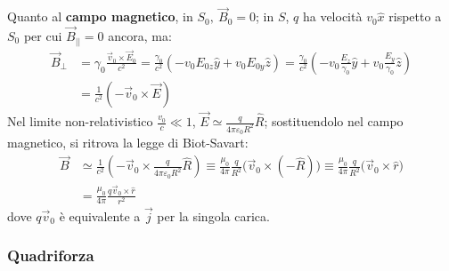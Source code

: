 \documentclass[10pt, a4paper]{scrartcl}
\numberwithin{equation}{subsection}
\theoremstyle{style1}
\begin{document}
Quanto al \textbf{campo magnetico}, in $S_0, \ \vec{B}_0 = 0$; in $S$, $q$ ha velocit\`a $v_0 \hat{x}$ rispetto a $S_0$ per cui $\vec{B}_{| | } =0 $ ancora, ma:
\begin{equation}
	\begin{split}
		\vec{B}_{\perp} &= \gamma_0 \frac{\vec{v}_0 \times \vec{E}_0}{c^2} = \frac{\gamma_0}{c^2} \left(-v_0E_{0z} \hat{y} + v_0E_{0y} \hat{z} \right) = \frac{\gamma_0}{c^2} \left(-v_0 \frac{E_z}{\gamma_0} \hat{y} + v_0 \frac{E_{y} }{\gamma_0}\hat{z} \right)   \\
		&=  \frac{1}{c^2}(-\vec{v}_0 \times \vec{E})
	\end{split}
\end{equation}
Nel limite non-relativistico $\frac{v_0}{c}\ll 1$, $\vec{E}\simeq \frac{q}{4\pi \varepsilon _0 R^2} \hat{R}$; sostituendolo nel campo magnetico, si ritrova la legge di Biot-Savart:
\begin{equation}
	\begin{split}
		\vec{B}&\simeq \frac{1}{c^2} \left(-\vec{v}_0 \times \frac{q}{4\pi \varepsilon _0  R^2}\hat{R}\right) \equiv \frac{\mu_0}{4 \pi} \frac{q}{R^2}\big(\vec{v}_0 \times (-\hat{R})\big) \equiv\frac{\mu_0}{4 \pi} \frac{q}{R^2}\big(\vec{v}_0 \times \hat{r}\big) \\
		& = \frac{\mu_0}{4\pi} \frac{q\vec{v}_0 \times \hat{r}}{r^2}
	\end{split}
\end{equation}
dove $q\vec{v}_0$ \`e equivalente a $\vec{j}$ per la singola carica. 
\subsubsection{Quadriforza}
\end{document}
